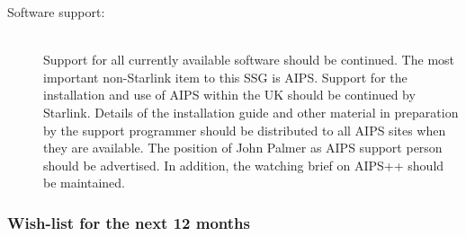 \begin{description}
\item[Software support:]\mbox{}\\
Support for all currently available software should be continued. The
most important non-Starlink item to this SSG is AIPS. Support for the
installation and use of AIPS within the UK should be continued by
Starlink. Details of the installation guide and other material in
preparation by the support programmer should be distributed to all
AIPS sites when they are available. The position of John Palmer as
AIPS support person should be advertised. In addition, the watching
brief on AIPS++ should be maintained.

\end{description}

\subsubsection{Wish-list for the next 12 months}

